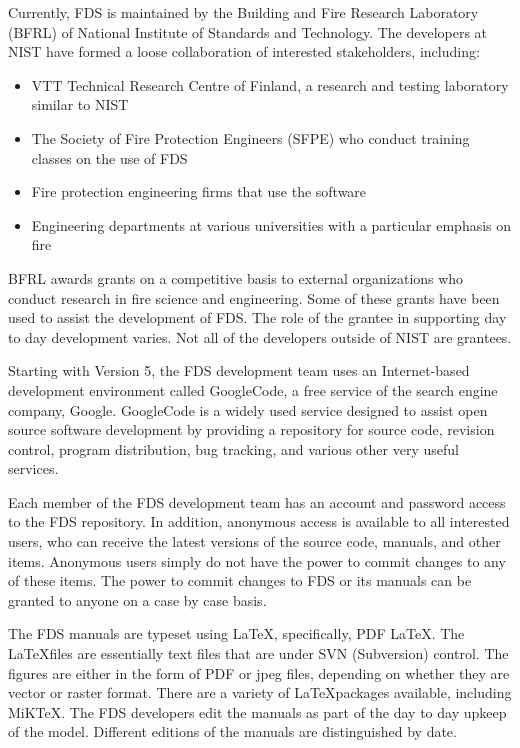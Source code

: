 \documentclass[11pt]{book}
\begin{document}
Currently, FDS is maintained by the Building and Fire Research Laboratory (BFRL) of National Institute of Standards and Technology. The developers at
NIST have formed a loose collaboration of interested stakeholders, including:
\begin{itemize}
\item VTT Technical Research Centre of Finland, a research and testing
laboratory similar to NIST
\item The Society of Fire Protection Engineers (SFPE) who conduct training classes on the use of FDS
\item Fire protection engineering firms that use the software
\item Engineering departments at various universities with a particular emphasis on fire
\end{itemize}
BFRL awards grants on a competitive basis to external organizations who conduct research in fire science and engineering. Some of these grants have
been used to assist the development of FDS. The role of the grantee in supporting day to day development varies. Not all of the developers outside of
NIST are grantees.

Starting with Version 5, the FDS development team uses an Internet-based development environment called GoogleCode, a free service of the search
engine company, Google. GoogleCode is a widely used service designed to assist open source software development by providing a repository for source
code, revision control, program distribution, bug tracking, and various other very useful services.

Each member of the FDS development team has an account and password access to the FDS repository. In addition, anonymous access is available to all
interested users, who can receive the latest versions of the source code, manuals, and other items. Anonymous users simply do not have the power to
commit changes to any of these items. The power to commit changes to FDS or its manuals can be granted to anyone on a case by case basis.

The FDS manuals are typeset using \LaTeX, specifically, PDF \LaTeX. The \LaTeX files are essentially text files that are under SVN (Subversion)
control. The figures are either in the form of PDF or jpeg files, depending on whether they are vector or raster format. There are a variety of
\LaTeX packages available, including MiKTeX. The FDS developers edit the manuals as part of the day to day upkeep of the model. Different editions of
the manuals are distinguished by date.
\end{document}

